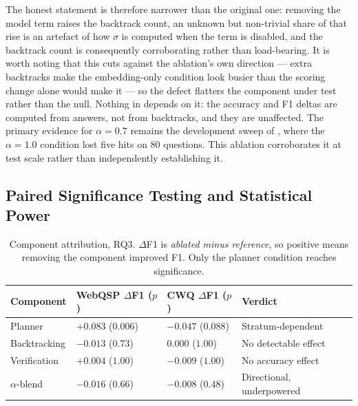The honest statement is therefore narrower than the original one: removing the
model term raises the backtrack count, an unknown but non-trivial share of that
rise is an artefact of how $\sigma$ is computed when the term is disabled, and
the backtrack count is consequently corroborating rather than load-bearing. It
is worth noting that this cuts against the ablation's own direction --- extra
backtracks make the embedding-only condition look busier than the scoring change
alone would make it --- so the defect flatters the component under test rather
than the null. Nothing in  depends on it: the accuracy and F1
deltas are computed from answers, not from backtracks, and they are unaffected.
The primary evidence for $\alpha = 0.7$ remains the development sweep of
, where the $\alpha = 1.0$ condition lost five hits on $80$
questions. This ablation corroborates it at test scale rather than
independently establishing it.

\subsection{Paired Significance Testing and Statistical Power}

\begin{table}[!tb]
  \begin{center}
    \caption[Component attribution]{Component attribution, RQ3. $\Delta$F1 is
    \emph{ablated minus reference}, so positive means removing the component
    improved F1. Only the planner condition reaches significance.}
    \label{tab:rq3}
    \small
    \begin{tabular}{|l|l|l|l|}
      \hline
      \textbf{Component} & \textbf{WebQSP $\Delta$F1 ($p$)} &
      \textbf{CWQ $\Delta$F1 ($p$)} & \textbf{Verdict} \\
      \hline
      Planner & $+0.083$ ($0.006$) & $-0.047$ ($0.088$) & Stratum-dependent \\
      Backtracking & $-0.013$ ($0.73$) & $0.000$ ($1.00$) &
        No detectable effect \\
      Verification & $+0.004$ ($1.00$) & $-0.009$ ($1.00$) &
        No accuracy effect \\
      $\alpha$-blend & $-0.016$ ($0.66$) & $-0.008$ ($0.48$) &
        Directional, underpowered \\
      \hline
    \end{tabular}
  \end{center}
\end{table}

